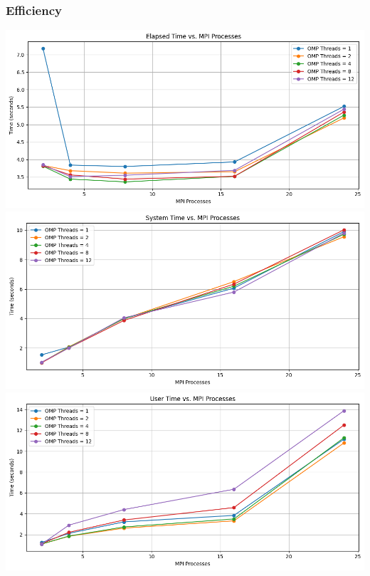 \documentclass[
]{article}
\begin{document}
\subsubsection{Efficiency}\label{efficiency-2}

\includegraphics{figures/elapsed_time.png}
\includegraphics{figures/system_time.png}
\includegraphics{figures/user_time.png}
\end{document}
